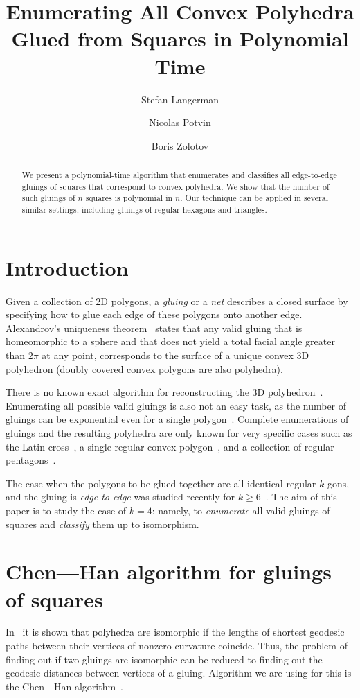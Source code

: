 \documentclass[a4paper,USenglish,cleveref, autoref, thm-restate]{socg-lipics-v2019}
\title{Enumerating All Convex Polyhedra Glued from Squares in Polynomial Time}
\author{Stefan Langerman}{Faculté des Sciences, Université Libre de Bruxelles}{stefan.langerman@ulb.ac.be}{ }{is Directeur de recherches du F.R.S.-FNRS}
\author{Nicolas Potvin}{Faculté des Sciences, Université Libre de Bruxelles}{potvinnicolas2@gmail.com}{ }{}
\author{Boris Zolotov}{Department of Mathematics and Computer Sciences, St. Petersburg State University}{boris.a.zolotov@yandex.com}{ }{is supported in part by the Foundation for the Advancement of Theoretical Physics and Mathematics ``BASIS'' and in part by ``Native towns'', a social investment program of PJSC ``Gazprom Neft''.}
\begin{document}
\maketitle

\begin{abstract}We present a polynomial-time algorithm that enumerates and classifies all edge-to-edge gluings of squares that correspond to convex polyhedra. We show that the number of such gluings of $n$ squares is polynomial in $n$. Our technique can be applied in several similar settings, including gluings of regular hexagons and triangles.\end{abstract}

\section{Introduction}

Given a collection of 2D polygons, a \emph{gluing} or a \emph{net} describes a closed surface by specifying how to glue each edge of these polygons onto another edge. Alexandrov's uniqueness theorem~\cite{alex} states that any valid gluing that is homeomorphic to a sphere and that does not yield a total facial angle greater than $2\pi$ at any point, corresponds to the surface of a unique convex 3D polyhedron (doubly covered convex polygons are also polyhedra).

There is no known exact algorithm for reconstructing the 3D polyhedron~\cite{bannister2014galois,kpd09-approx}. Enumerating all possible valid gluings is also not an easy task, as the number of gluings can be exponential even for a single polygon~\cite{DDLO02}. Complete enumerations of gluings and the resulting polyhedra are only known for very specific cases such as the Latin cross~\cite{ddlop99}, a single regular convex polygon~\cite{DO07}, and a collection of regular pentagons~\cite{alz-penta}.

The case when the polygons to be glued together are all identical regular $k$-gons, and the gluing is \emph{edge-to-edge} was studied recently for $k \ge 6$~\cite{kl17-hex}. The aim of this paper is to study the case of $k=4$: namely, to {\it enumerate} all valid gluings of squares and {\it classify} them up to isomorphism.

\section{Chen—Han algorithm for gluings of squares}

In~\cite{DO07} it is shown that polyhedra are isomorphic if the lengths of shortest geodesic paths between their vertices of nonzero curvature coincide. Thus, the problem of finding out if two gluings are isomorphic can be reduced to finding out the geodesic distances between vertices of a gluing. Algorithm we are using for this is the Chen—Han algorithm~\cite{chen-han}.
\end{document}
